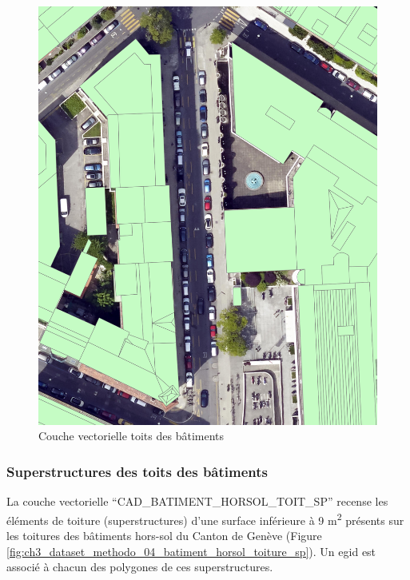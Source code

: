 \begin{figure}[H]
    \centering
    \includegraphics[width=1\linewidth]{02-main//figures/ch3/ch3_dataset_methodo_03_batiment_horsol_toiture.png}
    \caption{Couche vectorielle toits des bâtiments}
    \label{fig:ch3_dataset_methodo_03_batiment_horsol_toiture}
\end{figure}

\newpage
\subsubsection{Superstructures des toits des bâtiments}
La couche vectorielle ``CAD\_BATIMENT\_HORSOL\_TOIT\_SP'' \cite{sitg_toits_nodate} recense les éléments de toiture (superstructures) d'une surface inférieure à 9 \si{\unit{\square\meter}} présents sur les toitures des bâtiments hors-sol du Canton de Genève (Figure \ref{fig:ch3_dataset_methodo_04_batiment_horsol_toiture_sp}). Un \gls{egid} est associé à chacun des polygones de ces superstructures.

